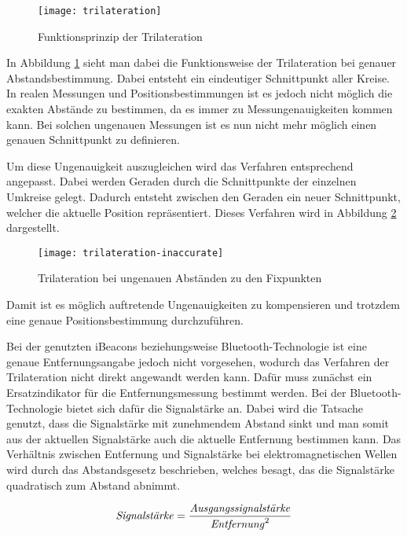 \begin{figure}[htb!]
	\centering
	\texttt{[image: trilateration]}
	\caption{Funktionsprinzip der Trilateration}
	\label{trilateration-accurate}
\end{figure}

In Abbildung \ref{trilateration-accurate} sieht man dabei die Funktionsweise der Trilateration bei genauer Abstandsbestimmung. Dabei entsteht ein eindeutiger Schnittpunkt aller Kreise. In realen Messungen und Positionsbestimmungen ist es jedoch nicht möglich die exakten Abstände zu bestimmen, da es immer zu Messungenauigkeiten kommen kann.
Bei solchen ungenauen Messungen ist es nun nicht mehr möglich einen genauen Schnittpunkt zu definieren. 

Um diese Ungenauigkeit auszugleichen wird das Verfahren entsprechend angepasst. Dabei werden Geraden durch die Schnittpunkte der einzelnen Umkreise gelegt. Dadurch entsteht zwischen den Geraden ein neuer Schnittpunkt, welcher die aktuelle Position repräsentiert. Dieses Verfahren wird in Abbildung \ref{trilateration-inaccurate} dargestellt.

\begin{figure}[htb!]
		\centering
	\texttt{[image: trilateration-inaccurate]}
	\caption{Trilateration bei ungenauen Abständen zu den Fixpunkten}
	\label{trilateration-inaccurate}
\end{figure}

Damit ist es möglich auftretende Ungenauigkeiten zu kompensieren und trotzdem eine genaue Positionsbestimmung durchzuführen.

Bei der genutzten iBeacons beziehungsweise Bluetooth-Technologie ist eine genaue Entfernungsangabe jedoch nicht vorgesehen, wodurch das Verfahren der Trilateration nicht direkt angewandt werden kann. Dafür muss zunächst ein Ersatzindikator für die Entfernungsmessung bestimmt werden.
Bei der Bluetooth-Technologie bietet sich dafür die Signalstärke an.
Dabei wird die Tatsache genutzt, dass die Signalstärke mit zunehmendem Abstand sinkt und man somit aus der aktuellen Signalstärke auch die aktuelle Entfernung bestimmen kann. 
Das Verhältnis zwischen Entfernung und Signalstärke bei elektromagnetischen Wellen wird durch das Abstandsgesetz beschrieben, welches besagt, das die Signalstärke quadratisch zum Abstand abnimmt.

\begin{equation}
	\text{\emph{Signalstärke}} = \frac{\text{\emph{Ausgangssignalstärke}}}{\text{\emph{Entfernung}}^2}
\end{equation}

